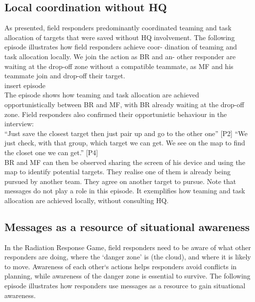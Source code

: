 \subsection{Local coordination without HQ}
As presented, field responders predominantly coordinated teaming and task allocation of targets that were saved without HQ involvement. The following episode illustrates how field responders achieve coor- dination of teaming and task allocation locally. We join the action as BR and an- other responder are waiting at the drop-off zone without a compatible teammate, as MF and his teammate join and drop-off their target.\\

insert episode\\

The episode shows how teaming and task allocation are achieved opportunistically between BR and MF, with BR already waiting at the drop-off zone. Field responders also confirmed their opportunistic behaviour in the interview:\\

``Just save the closest target then just pair up and go to the other one'' [P2] ``We just check, with that group, which target we can get. We see on the map to find the closet one we can get.'' [P4]\\

BR and MF can then be observed sharing the screen of his device and using the map to identify potential targets. They realise one of them is already being pursued by another team. They agree on another target to pursue. Note that messages do not play a role in this episode. It exemplifies how teaming and task allocation are achieved locally, without consulting HQ.\\




\subsection{Messages as a resource of situational awareness}
In the Radiation Response Game, field responders need to be aware of what other responders are doing, where the `danger zone' is (the cloud), and where it is likely to move. Awareness of each other`s actions helps responders avoid conflicts in planning, while awareness of the danger zone is essential to survive. The following episode illustrates how responders use messages as a resource to gain situational awareness.\\

